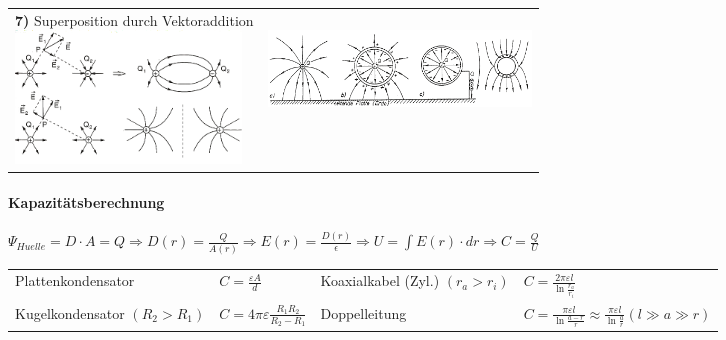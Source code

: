 \begin{tabular}[t]{ll}
	\parbox{6cm}{\textbf{7)} Superposition durch Vektoraddition\\
	\includegraphics[width=6cm]{./bilder/e-feldlinien.png}
	}
	& \parbox{12cm}{
	\\
	\includegraphics[width=7cm]{./bilder/leiter-im-efeld.png}}
\end{tabular}

	\paragraph{Kapazitätsberechnung} $\Psi_{Huelle} = D \cdot A = Q \Rightarrow D(r) = 	
	\frac{Q}{A(r)} \Rightarrow E(r) = \frac{D(r)}{\epsilon}\Rightarrow U = \int E(r) \cdot dr 
	\Rightarrow C = \frac{Q}{U}$\\

\renewcommand{\arraystretch}{2}
\begin{tabular}{p{5cm} p{3cm} p{5cm} p{5cm}}
Plattenkondensator
	& $\displaystyle C = \frac{\varepsilon A}{d}$
	& Koaxialkabel (Zyl.) $(r_a > r_i)$
	& $\displaystyle C = \frac{2 \pi \varepsilon l}{\ln \frac{r_a}{r_i}} $ \\
Kugelkondensator $(R_2 > R_1)$
	& $\displaystyle C = 4 \pi \varepsilon \frac{R_1 R_2}{R_2 - R_1}$ 
	& Doppelleitung
	& $\displaystyle C = \frac{\pi \varepsilon l}{\ln \frac{a-r}{r}} \approx 
\frac{\pi \varepsilon l}{\ln \frac{a}{r}} (l \gg a \gg r)$
\end{tabular} 
\renewcommand{\arraystretch}{1}  
\vspace{0.2cm} \\ 

